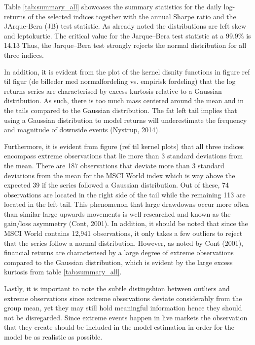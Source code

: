 Table \ref{tab:summary_all} showcases the summary statistics for the daily log-returns of the selected indices together with the annual Sharpe ratio and the JArque-Bera (JB) test statistic. As already noted the distributions are left skew and leptokurtic. The critical value for the Jarque–Bera test statistic at a 99.9\% is 14.13 Thus, the Jarque–Bera test strongly rejects the normal distribution for all three indices.  

In addition, it is evident from the plot of the kernel disnity functions in figure ref til figur (de billeder med normalfordeling vs. empirisk fordeling) that the log returns series are characterised by excess kurtosis relative to a Gaussian distribution. As such, there is too much mass centered around the mean and in the tails compared to the Gaussian distribution. The fat left tail implies that using a Gaussian distribution to model returns will underestimate the frequency and magnitude of downside events (Nystrup, 2014). 


Furthermore, it is evident from figure (ref til kernel plots) that all three indices encompass extreme observations that lie more than 3 standard deviations from the mean. There are 187 observations that deviate more than 3 standard deviations from the mean for the MSCI World index which is way above the expected 39 if the series followed a Gaussian distribution. Out of these, 74 observations are located in the right side of the tail while the remaining 113 are located in the left tail. This phenomenon that large drawdowns occur more often than similar large upwards movements is well researched and known as the gain/loss asymmetry (Cont, 2001). In addition, it should be noted that since the MSCI World contains 12,941 observations, it only takes a few outliers to reject that the series follow a normal distribution. However, as noted by Cont (2001), financial returns are characterised by a large degree of extreme observations compared to the Gaussian distribution, which is evident by the large excess kurtosis from table \ref{tab:summary_all}.

Lastly, it is important to note the subtle distingshion between outliers and extreme observations since extreme observations deviate considerably from the group mean, yet they may still hold meaningful information hence they should not be disregarded.
Since extreme events happen in live markets the observation that they create should be included in the model estimation in order for the model be as realistic as possible.

